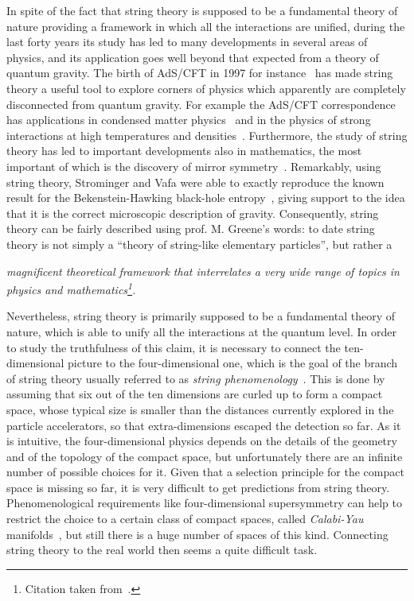 \documentclass[12pt,a4paper]{book}
\begin{document}
In spite of the fact that string theory is supposed to be a fundamental theory of nature providing a framework in which all the interactions are unified, during the last forty years its study has led to many developments in several areas of physics, and its application goes well beyond that expected from a theory of quantum gravity. The birth of AdS/CFT in 1997 for instance~\cite{Maldacena:1997re, Aharony:1999ti} has made string theory a useful tool to explore corners of physics which apparently are completely disconnected from quantum gravity. For example the AdS/CFT correspondence has applications in condensed matter physics~\cite{Sachdev:2010ch} and in the physics of strong interactions at high temperatures and densities~\cite{Sadeghi:2013zma}. Furthermore, the study of string theory has led to important developments also in mathematics, the most important of which is the discovery of mirror symmetry~\cite{Candelas:1989hd, Greene:1990ud}. Remarkably, using string theory, Strominger and Vafa were able to exactly reproduce the known result for the Bekenstein-Hawking black-hole entropy~\cite{Strominger:1996sh}, giving support to the idea that it is the correct microscopic description of gravity. Consequently, string theory can be fairly described using prof. M. Greene's words: to date string theory is not simply a ``theory of string-like elementary particles'', but rather a

\begin{center}
\textit{magnificent theoretical framework that interrelates a very wide range of topics in physics and mathematics\footnote{Citation taken from~\cite{ConlonBook}.}.}
\end{center}

Nevertheless, string theory is primarily supposed to be a fundamental theory of nature, which is able to unify all the interactions at the quantum level. In order to study the truthfulness of this claim, it is necessary to connect the ten-dimensional picture to the four-dimensional one, which is the goal of the branch of string theory usually referred to as \textit{string phenomenology}~\cite{Ibanez:2012zz}. This is done by assuming that six out of the ten dimensions are curled up to form a compact space, whose typical size is smaller than the distances currently explored in the particle accelerators, so that extra-dimensions escaped the detection so far. As it is intuitive, the four-dimensional physics depends on the details of the geometry and of the topology of the compact space, but unfortunately there are an infinite number of possible choices for it. Given that a selection principle for the compact space is missing so far, it is very difficult to get predictions from string theory. Phenomenological requirements like four-dimensional supersymmetry can help to restrict the choice to a certain class of compact spaces, called \textit{Calabi-Yau} manifolds~\cite{Greene:1996cy, Hubsch:1992nu}, but still there is a huge number of spaces of this kind. Connecting string theory to the real world then seems a quite difficult task.\\
\end{document}
